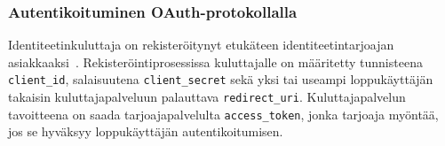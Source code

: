 \documentclass[finnish,gradu]{tktltiki}
\begin{document}

  \subsubsection{Autentikoituminen OAuth-protokollalla} %
  \label{ssub:autentikoituminen_oauth_protokollalla}

  Identiteetinkuluttaja on rekisteröitynyt etukäteen identiteetintarjoajan asiakkaaksi~\cite{google_oauth2_doc, facebook_oauth2_doc}. Rekisteröintiprosessissa kuluttajalle on määritetty tunnisteena \verb!client_id!, salaisuutena \verb!client_secret! sekä yksi tai useampi loppukäyttäjän takaisin kuluttajapalveluun palauttava \verb!redirect_uri!. Kuluttajapalvelun tavoitteena on saada tarjoajapalvelulta \verb!access_token!, jonka tarjoaja myöntää, jos se hyväksyy loppukäyttäjän autentikoitumisen.
\end{document}
